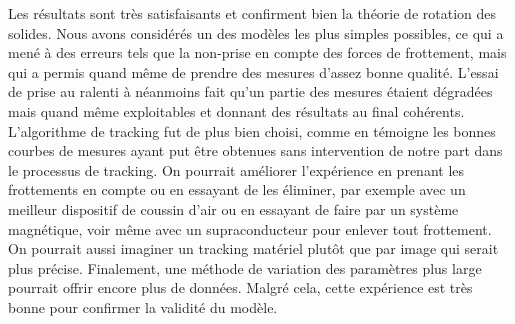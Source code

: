 Les résultats sont très satisfaisants et confirment bien la théorie de rotation des solides. Nous avons considérés un des modèles les plus simples possibles, ce qui a mené à des erreurs tels que la non-prise en compte des forces de frottement, mais qui a permis quand même de prendre des mesures d'assez bonne qualité. L'essai de prise au ralenti à néanmoins fait qu'un partie des mesures étaient dégradées mais quand même exploitables et donnant des résultats au final cohérents. L'algorithme de tracking fut de plus bien choisi, comme en témoigne les bonnes courbes de mesures ayant put être obtenues sans intervention de notre part dans le processus de tracking. On pourrait améliorer l'expérience en prenant les frottements en compte ou en essayant de les éliminer, par exemple avec un meilleur dispositif de coussin d'air ou en essayant de faire par un système magnétique, voir même avec un supraconducteur pour enlever tout frottement. On pourrait aussi imaginer un tracking matériel plutôt que par image qui serait plus précise. Finalement, une méthode de variation des paramètres plus large pourrait offrir encore plus de données. Malgré cela, cette expérience est très bonne pour confirmer la validité du modèle.
